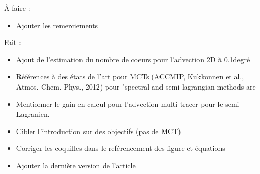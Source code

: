 \documentclass{article}
\begin{document}
\`A faire :
\begin{itemize}
\item Ajouter les remerciements
\end{itemize}

Fait :
\begin{itemize}
\item Ajout de l'estimation du nombre de coeurs pour l'advection 2D à 0.1degr\'e
\item R\'ef\'erences à des \'etats de l'art pour MCTs (ACCMIP, Kukkonnen et al.,
Atmos.  Chem. Phys., 2012) pour "spectral and semi-lagrangian methods are
\item Mentionner le gain en calcul pour l'advection multi-tracer pour le
  semi-Lagranien.
\item Cibler l'introduction sur des objectifs (pas de MCT)
\item Corriger les coquilles dans le ref\'erencement des figure et \'equations
\item Ajouter la derni\`ere version de l'article
\end{itemize}
\end{document}
